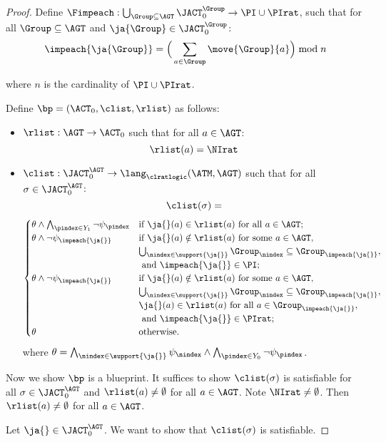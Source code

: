 \begin{proof}
  Define $\Fimpeach: \bigcup_{\Group\subseteq \AGT }\JACT^{\Group}_0 \to \PI\cup\PIrat$, such that for all $\Group \subseteq \AGT$ and $\ja{\Group}\in \JACT^{\Group}_0$:
  $$
  \impeach{\ja{\Group}} = \Big( \sum_{a \in \Group} \move{\Group}{a} \Big) \bmod n$$
  
  \noindent where $n$ is the cardinality of $\PI\cup\PIrat$.

  Define $\bp = (\ACT_0, \clist, \rlist)$ as follows:
  \begin{itemize}
    \item $\rlist: \AGT \to \ACT_0$ such that for all $a\in \AGT $:
    $$\rlist(a)=\NIrat $$
    \item $\clist: \JACT^{\AGT}_0 \to \lang_{\clratlogic}(\ATM, \AGT )$ such that for all $\sigma\in \JACT^{\AGT}_0$:
    $$\clist(\sigma)=$$
    $$
    \begin{cases}    
      \theta \wedge \bigwedge_{\pindex\in Y_1}\neg \psi_\pindex&\text{if }{\ja{}(a)}\in \rlist(a)\text{ for all }a\in \AGT;\\
      \theta \wedge \neg \psi_{\impeach{\ja{}}}&\text{if }{\ja{}(a)}\notin \rlist(a)\text{ for some }a\in \AGT,\\
      &\bigcup_{\nindex\in \support{\ja{}}}\Group_\nindex\subseteq \Group_\impeach{\ja{}},\\
      &\text{ and }\impeach{\ja{}}\in \PI;\\
      \theta \wedge \neg \psi_{\impeach{\ja{}}}&\text{if }{\ja{}(a)}\notin \rlist(a)\text{ for some }a\in \AGT,\\
      &\bigcup_{\nindex\in \support{\ja{}}}\Group_\nindex\subseteq \Group_\impeach{\ja{}},\\
      &{\ja{}(a)\in \rlist(a)}\text{ for all }a\in \Group_\impeach{\ja{}},\\
      &\text{ and }\impeach{\ja{}}\in \PIrat;\\
      \theta &\text{otherwise. }
    \end{cases}$$
    where $\theta = \bigwedge_{\nindex\in \support{\ja{}}}\psi_\nindex \wedge \bigwedge_{\pindex \in Y_{0}}\neg \psi_\pindex$.
  \end{itemize}
  
  Now we show $\bp $ is a blueprint. It suffices to show $\clist(\sigma)$ is satisfiable for all $\sigma\in \JACT^{\AGT}_0$ and $\rlist(a)\neq \emptyset$ for all $a\in \AGT$. Note $\NIrat \neq \emptyset $. Then $\rlist(a)\neq \emptyset$ for all $a\in \AGT$.

  Let $\ja{}\in \JACT^{\AGT}_0$. We want to show that $\clist(\sigma)$ is satisfiable. 
  

\end{proof}
